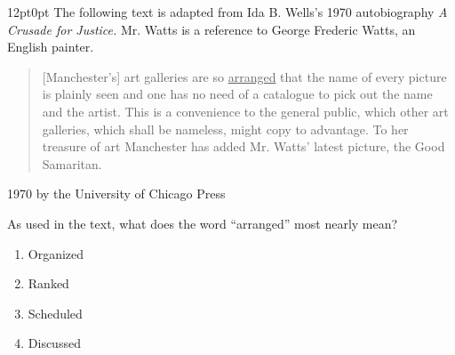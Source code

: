 \documentclass[11pt, twocolumn]{article}
\newcounter{questionnum}
\begin{document}
\vspace{6pt}\noindent
\begin{minipage}{\columnwidth}\raggedright
\noindent{}\par\vspace{8pt}
\begin{adjustwidth}{12pt}{0pt}
The following text is adapted from Ida B. Wells's 1970 autobiography \textit{A Crusade for Justice.} Mr. Watts is a reference to George Frederic Watts, an English painter.

\vspace{6pt}
\begin{quote}

[Manchester's] art galleries are so \uline{arranged} that the name of every picture is plainly seen and one has no need of a catalogue to pick out the name and the artist. This is a convenience to the general public, which other art galleries, which shall be nameless, might copy to advantage. To her treasure of art Manchester has added Mr. Watts' latest picture, the Good Samaritan.

\end{quote}

\textcopyright{}1970 by the University of Chicago Press
\vspace{6pt}

As used in the text, what does the word ``arranged'' most nearly mean?
\begin{enumerate}[label=\Alph*),leftmargin=18pt,topsep=3pt,itemsep=2pt]
  \item Organized
  \item Ranked
  \item Scheduled
  \item Discussed
\end{enumerate}
\end{adjustwidth}
\end{minipage}\par
\end{document}
